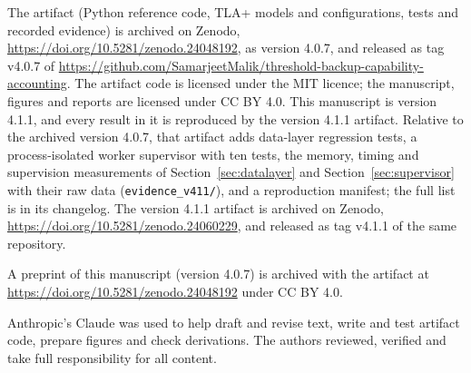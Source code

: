 \documentclass[pdflatex,sn-mathphys-num,twocolumn]{sn-jnl}
\theoremstyle{plain}
\theoremstyle{definition}
\newcommand{\code}[1]{\texttt{#1}}
\begin{document}
The artifact (Python reference code, TLA+ models and configurations, tests and recorded evidence) is archived on Zenodo, \url{https://doi.org/10.5281/zenodo.24048192}, as version 4.0.7, and released as tag v4.0.7 of \url{https://github.com/SamarjeetMalik/threshold-backup-capability-accounting}. The artifact code is licensed under the MIT licence; the manuscript, figures and reports are licensed under CC BY 4.0. This manuscript is version 4.1.1, and every result in it is reproduced by the version 4.1.1 artifact. Relative to the archived version 4.0.7, that artifact adds data-layer regression tests, a process-isolated worker supervisor with ten tests, the memory, timing and supervision measurements of Section~\ref{sec:datalayer} and Section~\ref{sec:supervisor} with their raw data (\code{evidence\_v411/}), and a reproduction manifest; the full list is in its changelog. The version 4.1.1 artifact is archived on Zenodo, \url{https://doi.org/10.5281/zenodo.24060229}, and released as tag v4.1.1 of the same repository.

A preprint of this manuscript (version 4.0.7) is archived with the artifact at \url{https://doi.org/10.5281/zenodo.24048192} under CC BY 4.0.

Anthropic's Claude was used to help draft and revise text, write and test artifact code, prepare figures and check derivations. The authors reviewed, verified and take full responsibility for all content.
\end{document}
